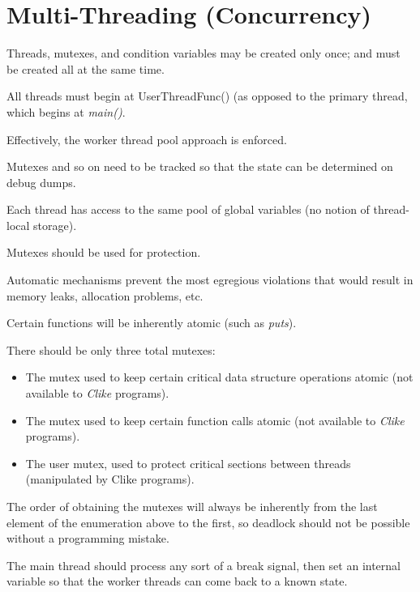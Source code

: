 \section{Multi-Threading (Concurrency)}
\label{ccik2:scnc0}

Threads, mutexes, and condition variables may be created only once; and must be created all at the
same time.

All threads must begin at UserThreadFunc() (as opposed to the primary thread, which begins at
\emph{main()}.

Effectively, the worker thread pool approach is enforced.

Mutexes and so on need to be tracked so that the state can be determined on debug dumps.

Each thread has access to the same pool of global variables (no notion of thread-local storage).

Mutexes should be used for protection.

Automatic mechanisms prevent the most egregious violations that would result in memory leaks, allocation problems, etc.

Certain functions will be inherently atomic (such as \emph{puts}).

There should be only three total mutexes:
\begin{itemize}
\item The mutex used to keep certain critical data structure operations atomic (not available to
      \emph{Clike} programs).
\item The mutex used to keep certain function calls atomic (not available to \emph{Clike} programs).
\item The user mutex, used to protect critical sections between threads (manipulated by Clike programs).
\end{itemize}

The order of obtaining the mutexes will always be inherently from the last element of the enumeration
above to the first, so deadlock should not be possible without a programming mistake.

The main thread should process any sort of a break signal, then set an internal variable so that
the worker threads can come back to a known state.

